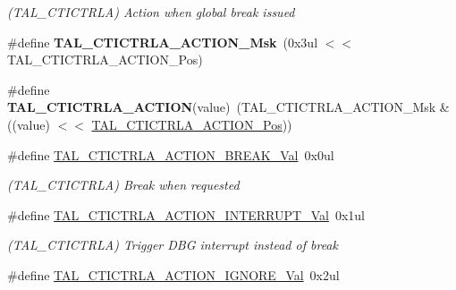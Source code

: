 \begin{DoxyCompactItemize}
\begin{DoxyCompactList}\small\item\em (T\+A\+L\+\_\+\+C\+T\+I\+C\+T\+R\+L\+A) Action when global break issued \end{DoxyCompactList}\item 
\hypertarget{group___s_a_m_l21___t_a_l_gac0074dce5faa538ad6ad6cacfdcf6c10}{}\#define {\bfseries T\+A\+L\+\_\+\+C\+T\+I\+C\+T\+R\+L\+A\+\_\+\+A\+C\+T\+I\+O\+N\+\_\+\+Msk}~(0x3ul $<$$<$ T\+A\+L\+\_\+\+C\+T\+I\+C\+T\+R\+L\+A\+\_\+\+A\+C\+T\+I\+O\+N\+\_\+\+Pos)\label{group___s_a_m_l21___t_a_l_gac0074dce5faa538ad6ad6cacfdcf6c10}

\item 
\hypertarget{group___s_a_m_l21___t_a_l_ga9c0b84d6d55e36fdbcf53f4450fc6bd0}{}\#define {\bfseries T\+A\+L\+\_\+\+C\+T\+I\+C\+T\+R\+L\+A\+\_\+\+A\+C\+T\+I\+O\+N}(value)~(T\+A\+L\+\_\+\+C\+T\+I\+C\+T\+R\+L\+A\+\_\+\+A\+C\+T\+I\+O\+N\+\_\+\+Msk \& ((value) $<$$<$ \hyperlink{group___s_a_m_l21___t_a_l_ga8854a5053c397d6160d4dbb6219a8f59}{T\+A\+L\+\_\+\+C\+T\+I\+C\+T\+R\+L\+A\+\_\+\+A\+C\+T\+I\+O\+N\+\_\+\+Pos}))\label{group___s_a_m_l21___t_a_l_ga9c0b84d6d55e36fdbcf53f4450fc6bd0}

\item 
\hypertarget{group___s_a_m_l21___t_a_l_ga7219b74e5ee3d7f3dcda06fb364bb5e8}{}\#define \hyperlink{group___s_a_m_l21___t_a_l_ga7219b74e5ee3d7f3dcda06fb364bb5e8}{T\+A\+L\+\_\+\+C\+T\+I\+C\+T\+R\+L\+A\+\_\+\+A\+C\+T\+I\+O\+N\+\_\+\+B\+R\+E\+A\+K\+\_\+\+Val}~0x0ul\label{group___s_a_m_l21___t_a_l_ga7219b74e5ee3d7f3dcda06fb364bb5e8}

\begin{DoxyCompactList}\small\item\em (T\+A\+L\+\_\+\+C\+T\+I\+C\+T\+R\+L\+A) Break when requested \end{DoxyCompactList}\item 
\hypertarget{group___s_a_m_l21___t_a_l_ga51c9f20bc157ce62adcee95962516058}{}\#define \hyperlink{group___s_a_m_l21___t_a_l_ga51c9f20bc157ce62adcee95962516058}{T\+A\+L\+\_\+\+C\+T\+I\+C\+T\+R\+L\+A\+\_\+\+A\+C\+T\+I\+O\+N\+\_\+\+I\+N\+T\+E\+R\+R\+U\+P\+T\+\_\+\+Val}~0x1ul\label{group___s_a_m_l21___t_a_l_ga51c9f20bc157ce62adcee95962516058}

\begin{DoxyCompactList}\small\item\em (T\+A\+L\+\_\+\+C\+T\+I\+C\+T\+R\+L\+A) Trigger D\+B\+G interrupt instead of break \end{DoxyCompactList}\item 
\hypertarget{group___s_a_m_l21___t_a_l_gaa45d117ebf5e2bef6af44ff3c62e780f}{}\#define \hyperlink{group___s_a_m_l21___t_a_l_gaa45d117ebf5e2bef6af44ff3c62e780f}{T\+A\+L\+\_\+\+C\+T\+I\+C\+T\+R\+L\+A\+\_\+\+A\+C\+T\+I\+O\+N\+\_\+\+I\+G\+N\+O\+R\+E\+\_\+\+Val}~0x2ul\label{group___s_a_m_l21___t_a_l_gaa45d117ebf5e2bef6af44ff3c62e780f}


\end{DoxyCompactItemize}
